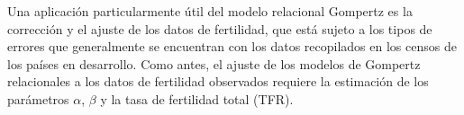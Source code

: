 Una aplicación particularmente útil del modelo relacional Gompertz es la corrección y el ajuste de los datos de fertilidad, que está sujeto a los tipos de errores que generalmente se encuentran con los datos recopilados en los censos de los países en desarrollo. Como antes, el ajuste de los modelos de Gompertz relacionales a los datos de fertilidad observados requiere la estimación de los parámetros $\alpha$, $\beta$ y la tasa de fertilidad total (TFR).